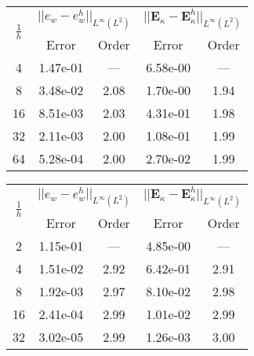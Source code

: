 \begin{table}[hp]
	\centering
	\begin{tabular}{ccccc}
		\hline 
		\multirow{2}{*}{$\frac{1}{h}$} & \multicolumn{2}{c}{$||e_w - e_w^h||_{L^{\infty}(L^2)}$}  & \multicolumn{2}{c}{$||\bm{E}_\kappa - \bm{E}_\kappa^h||_{L^{\infty}(L^2)}$}   \\ 
		& Error & Order  & Error & Order  \\
		\hline 
		4  & 1.47e-01 & ---  & 6.58e-00 & ---  \\ 
		8  & 3.48e-02 & 2.08 & 1.70e-00 & 1.94 \\ 
		16 & 8.51e-03 & 2.03 & 4.31e-01 & 1.98 \\ 
		32 & 2.11e-03 & 2.00 & 1.08e-01 & 1.99 \\ 
		64 & 5.28e-04 & 2.00 & 2.70e-02 & 1.99 \\ 
		\hline 
	\end{tabular} 
	\captionsetup{width=0.95\linewidth}
	\vspace{1mm}
	\label{tab:reskirHHJ_SSSS_k2}
\end{table}

\begin{table}[hp]
	\centering
	\begin{tabular}{ccccc}
		\hline 
		\multirow{2}{*}{$\frac{1}{h}$} & \multicolumn{2}{c}{$||e_w - e_w^h||_{L^{\infty}(L^2)}$}  & \multicolumn{2}{c}{$||\bm{E}_\kappa - \bm{E}_\kappa^h||_{L^{\infty}(L^2)}$}   \\ 
		& Error & Order  & Error & Order  \\
		\hline 
		2  & 1.15e-01 & ---  & 4.85e-00 & ---  \\ 
		4  & 1.51e-02 & 2.92 & 6.42e-01 & 2.91 \\ 
		8  & 1.92e-03 & 2.97 & 8.10e-02 & 2.98 \\ 
		16 & 2.41e-04 & 2.99 & 1.01e-02 & 2.99 \\ 
		32 & 3.02e-05 & 2.99 & 1.26e-03 & 3.00 \\ 
		\hline 
	\end{tabular} 
	\captionsetup{width=0.95\linewidth}
	\vspace{1mm}
	\label{tab:reskirHHJ_SSSS_k3}
\end{table}

